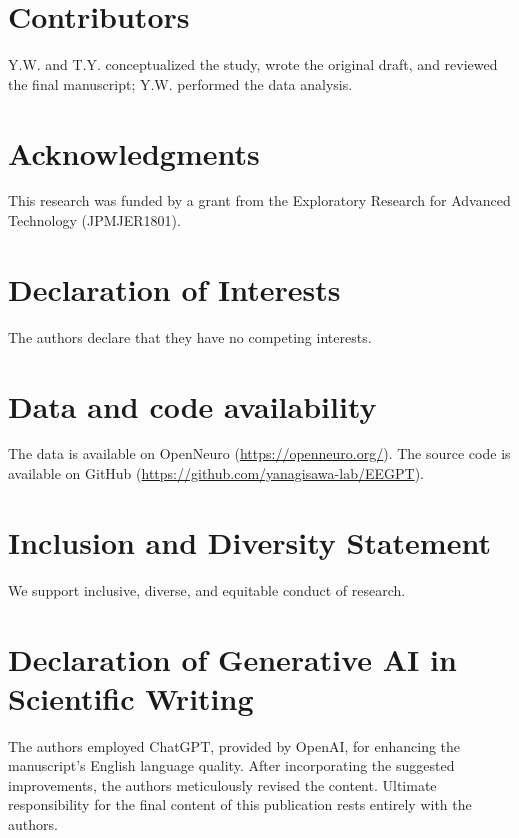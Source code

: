 \documentclass[final,3p,times,twocolumn]{elsarticle}
\begin{document}
\section*{Contributors}
Y.W. and T.Y. conceptualized the study, wrote the original draft, and reviewed the final manuscript; Y.W. performed the data analysis.
\label{contributors}

\section*{Acknowledgments}
This research was funded by a grant from the Exploratory Research for Advanced Technology (JPMJER1801).
\label{acknowledgments}

\section*{Declaration of Interests}
The authors declare that they have no competing interests.
\label{declaration of interests}

\section*{Data and code availability}
The data is available on OpenNeuro (\url{https://openneuro.org/}). The source code is available on GitHub (\url{https://github.com/yanagisawa-lab/EEGPT}).
\label{data and code availability}

\section*{Inclusion and Diversity Statement}
We support inclusive, diverse, and equitable conduct of research.
\label{inclusion and diversity statement}

\section*{Declaration of Generative AI in Scientific Writing}
The authors employed ChatGPT, provided by OpenAI, for enhancing the manuscript's English language quality. After incorporating the suggested improvements, the authors meticulously revised the content. Ultimate responsibility for the final content of this publication rests entirely with the authors.
\label{declaration of generative ai in scientific writing}
\end{document}
